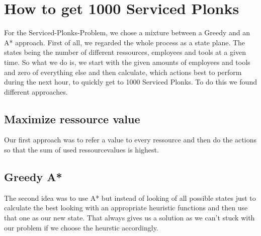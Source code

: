 \documentclass{article}
\begin{document}
 \section*{How to get 1000 Serviced Plonks}
 For the Serviced-Plonks-Problem, we chose a mixture between a Greedy and an A* approach. First of all, we regarded the whole process as a state plane. The states being the number of different ressources, employees and tools at a given time. So what we do is, we start with the given amounts of employees and tools and zero of everything else and then calculate, which actions best to perform during the next hour, to quickly get to 1000 Serviced Plonks. To do this we found different approaches.
  \subsection*{Maximize ressource value}
 Our first approach was to refer a value to every ressource and then do the actions so that the sum of used ressourcevalues is highest.
  \subsection*{Greedy A*}
 The second idea was to use A* but instead of looking of all possible states just to calculate the best looking with an appropriate heuristic functions and then use that one as our new state. That always gives us a solution as we can't stuck with our problem if we choose the heurstic accordingly.
 
\end{document}
